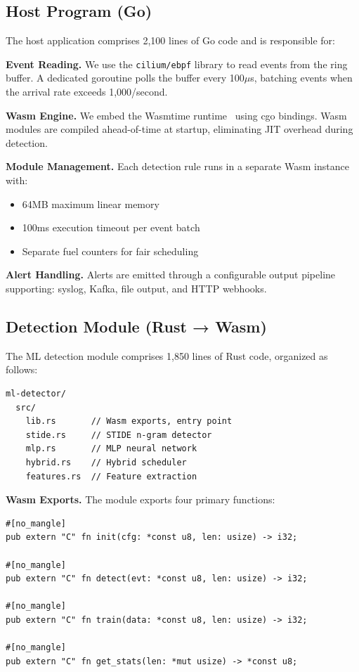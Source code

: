 \subsection{Host Program (Go)}

The host application comprises 2,100 lines of Go code and is responsible for:

\textbf{Event Reading.}
We use the \texttt{cilium/ebpf} library to read events from the ring buffer.
A dedicated goroutine polls the buffer every 100$\mu$s, batching events when the arrival rate exceeds 1,000/second.

\textbf{Wasm Engine.}
We embed the Wasmtime runtime~\cite{wasmtime} using cgo bindings.
Wasm modules are compiled ahead-of-time at startup, eliminating JIT overhead during detection.

\textbf{Module Management.}
Each detection rule runs in a separate Wasm instance with:
\begin{itemize}
    \item 64MB maximum linear memory
    \item 100ms execution timeout per event batch
    \item Separate fuel counters for fair scheduling
\end{itemize}

\textbf{Alert Handling.}
Alerts are emitted through a configurable output pipeline supporting:
syslog, Kafka, file output, and HTTP webhooks.

\subsection{Detection Module (Rust → Wasm)}

The ML detection module comprises 1,850 lines of Rust code, organized as follows:

\begin{lstlisting}[style=rust, caption={Module structure.}]
ml-detector/
  src/
    lib.rs       // Wasm exports, entry point
    stide.rs     // STIDE n-gram detector
    mlp.rs       // MLP neural network
    hybrid.rs    // Hybrid scheduler
    features.rs  // Feature extraction
\end{lstlisting}

\textbf{Wasm Exports.}
The module exports four primary functions:

\begin{lstlisting}[style=rust, caption={Wasm exported functions.}]
#[no_mangle]
pub extern "C" fn init(cfg: *const u8, len: usize) -> i32;

#[no_mangle]
pub extern "C" fn detect(evt: *const u8, len: usize) -> i32;

#[no_mangle]
pub extern "C" fn train(data: *const u8, len: usize) -> i32;

#[no_mangle]
pub extern "C" fn get_stats(len: *mut usize) -> *const u8;
\end{lstlisting}

